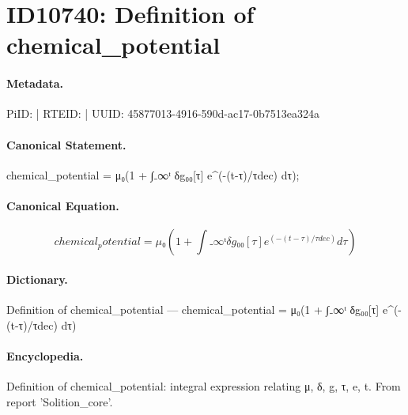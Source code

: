 \section*{ID10740: Definition of chemical\_potential}
\paragraph{Metadata.}
PiID:  | RTEID:  | UUID: 45877013-4916-590d-ac17-0b7513ea324a

\paragraph{Canonical Statement.}
chemical\_potential = μ₀(1 + ∫₋∞ᵗ δg₀₀[τ] e\textasciicircum{}(-(t-τ)/τdec) dτ);

\paragraph{Canonical Equation.}
\[
chemical_potential = μ₀(1 + ∫₋∞ᵗ δg₀₀[τ] e^(-(t-τ)/τdec) dτ)
\]

\paragraph{Dictionary.}
Definition of chemical\_potential — chemical\_potential = μ₀(1 + ∫₋∞ᵗ δg₀₀[τ] e\textasciicircum{}(-(t-τ)/τdec) dτ)

\paragraph{Encyclopedia.}
Definition of chemical\_potential: integral expression relating μ, δ, g, τ, e, t. From report 'Solition\_core'.
